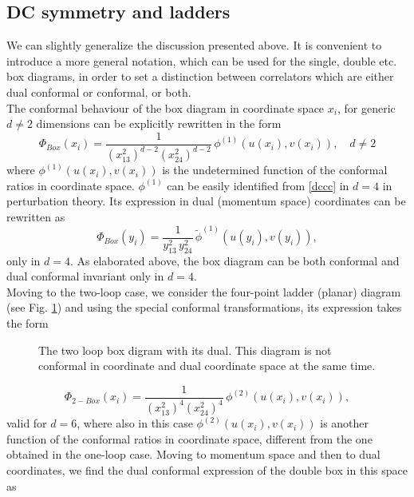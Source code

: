 \documentclass[a4paper,11pt,openright,twoside]{book}
\numberwithin{equation}{section}
\begin{document}
{\subsection{DC symmetry and ladders}
We can slightly generalize the discussion presented above. It is convenient to introduce a more general notation, which can be used for the single, double etc. box diagrams, in order to set a distinction between correlators which are either dual conformal or conformal, or both. \\
The conformal behaviour of the box diagram in coordinate space $x_i$, for generic $d\ne2$ dimensions 
can be explicitly rewritten in the form
\begin{equation}
	\Phi_{Box}(x_i)=\frac{1}{(x^2_{13})^{d-2}(x^2_{24})^{d-2}}\,\phi^{(1)}\left(u(x_i),v(x_i)\right),\quad d\ne2
\end{equation}
where $\phi^{(1)}\left(u(x_i),v(x_i)\right)$ is the undetermined function of the conformal ratios in coordinate space. 
$\phi^{(1)}$ can be easily identified from \eqref{dccc} in $d=4$ in perturbation theory. Its expression in dual (momentum space) coordinates can be rewritten as 
\begin{equation}
	\Phi_{Box}(y_i)=\frac{1}{y^2_{13}\,y^2_{24}}\,\tilde{\phi}^{(1)}\left(u(y_i),v(y_i)\right),
\end{equation}
only in $d=4$. As elaborated above,  the box diagram can be both conformal and dual conformal invariant only in $d=4$. \\
Moving to the two-loop case, we consider the four-point ladder (planar) diagram (see Fig. \ref{dbbb}) and using the special conformal transformations, its expression takes the form
\begin{figure}[t]
	\centering
	\caption{The two loop box digram with its dual. This diagram is not conformal in coordinate and dual coordinate space at the same time. }\label{dbbb}
\end{figure}
\begin{equation}
	\Phi_{2-Box}(x_i)=\frac{1}{(x^2_{13})^{4}(x^2_{24})^{4}}\,\phi^{(2)}\left(u(x_i),v(x_i)\right),
\end{equation}
valid for $d=6$, where also in this case $\phi^{(2)}\left(u(x_i),v(x_i)\right)$ is another function of the conformal ratios in coordinate space, different from the one obtained in the one-loop case. Moving to momentum space and then to dual coordinates, we find the dual conformal expression of the double box in this space as
}
\end{document}
